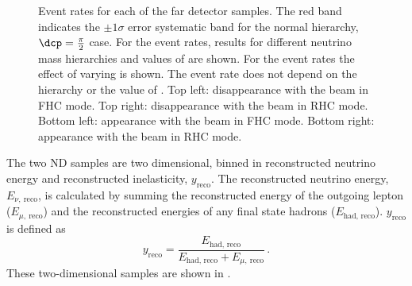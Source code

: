 \begin{figure}
	\begin{minipage}[t]{.5\linewidth}
		\begin{adjustbox}{max totalsize=\linewidth, center}
			
		\end{adjustbox} \\
		\begin{adjustbox}{max totalsize=\linewidth, center}
			
		\end{adjustbox}
	\end{minipage}
	\hfill
	\begin{minipage}[t]{.5\linewidth}
		\begin{adjustbox}{max totalsize=\linewidth, center}
			
		\end{adjustbox} \\
		\begin{adjustbox}{max totalsize=\linewidth, center}
			
		\end{adjustbox}
	\end{minipage}
	\caption[DUNE far detector event rates with systematic error bands.]{Event rates for each of the far detector samples. The red band indicates the $\pm1\sigma$ error systematic band for the normal hierarchy, $\dcp = \frac{\pi}{2}$ case. For the \nue event rates, results for different neutrino mass hierarchies and values of \dcp are shown. For the \numu event rates the effect of varying  is shown. The \numu event rate does not depend on the hierarchy or the value of \dcp. Top left: \numu disappearance with the beam in FHC mode. Top right: \numu disappearance with the beam in RHC mode. Bottom left: \nue appearance with the beam in FHC mode. Bottom right: \nue appearance with the beam in RHC mode.}
	\label{fig:fdEventRatesWithErrorBand}
\end{figure}

The two ND samples are two dimensional, binned in reconstructed neutrino energy and reconstructed inelasticity, $y_{\text{reco}}$.
The reconstructed neutrino energy, $E_{\nu,~\text{reco}}$, is calculated by summing the reconstructed energy of the outgoing lepton ($E_{\mu,~\text{reco}}$) and the reconstructed energies of any final state hadrons ($E_{\text{had, reco}}$).
$y_{\text{reco}}$ is defined as
\begin{equation}
	y_{\text{reco}} = \frac{E_{\text{had, reco}}}{ E_{\text{had, reco}} + E_{\mu,~\text{reco}} } \, .
\end{equation}
These two-dimensional samples are shown in .

